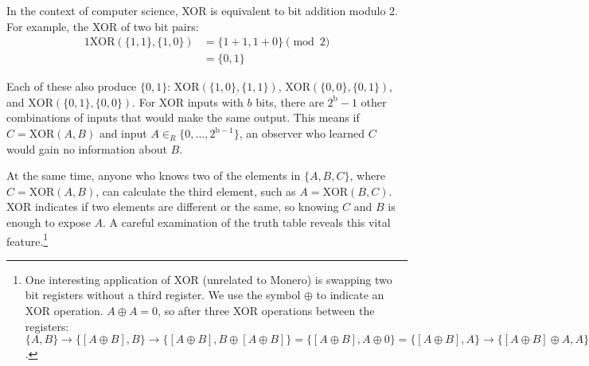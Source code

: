 In the context of computer science, XOR is equivalent to bit addition modulo 2. For example, the XOR of two bit pairs:
\begin{alignat*}{1}
    \text{XOR}(\{1,1\},\{1,0\}) &= \{1+1,1+0\} \pmod 2 \\
                                &= \{0,1\} 
\end{alignat*}

Each of these also produce $\{0,1\}$: $\text{XOR}(\{1,0\},\{1,1\})$, $\text{XOR}(\{0,0\},\{0,1\})$, and $\text{XOR}(\{0,1\},\{0,0\})$. For XOR inputs with $b$ bits, there are $2^{\text{b}} - 1$ other combinations of inputs that would make the same output. This means if $C = \text{XOR}(A,B)$ and input $A \in_R \{0,...,2^{\text{b}-1}\}$, an observer who learned $C$ would gain no information about $B$.

At the same time, anyone who knows two of the elements in $\{A,B,C\}$, where $C = \text{XOR}(A,B)$, can calculate the third element, such as $A = \text{XOR}(B,C)$. XOR indicates if two elements are different or the same, so knowing $C$ and $B$ is enough to expose $A$. A careful examination of the truth table reveals this vital feature.\footnote{One interesting application of XOR (unrelated to Monero) is swapping two bit registers without a third register. We use the symbol $\oplus$ to indicate an XOR operation. $A \oplus A = 0$, so after three XOR operations between the registers: $\{A, B\} \rightarrow{} \{[A \oplus B], B\} \rightarrow{} \{[A \oplus B], B \oplus [A \oplus B]\} = \{[A \oplus B], A \oplus 0\} = \{[A \oplus B], A\} \rightarrow{} \{[A \oplus B] \oplus A, A\} = \{B, A\}$.}
